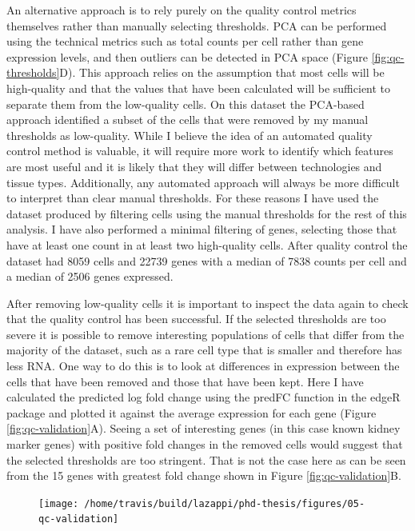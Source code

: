 \documentclass[11pt,a4paper,titlepage,twoside,openright]{style/unimelbthesis}
\theoremstyle{definition}
\theoremstyle{definition}
\theoremstyle{definition}
\theoremstyle{remark}
\begin{document}
\begin{mainmatter}
An alternative approach is to rely purely on the quality control metrics themselves rather than manually selecting thresholds. PCA can be performed using the technical metrics such as total counts per cell rather than gene expression levels, and then outliers can be detected in PCA space (Figure \ref{fig:qc-thresholds}D). This approach relies on the assumption that most cells will be high-quality and that the values that have been calculated will be sufficient to separate them from the low-quality cells. On this dataset the PCA-based approach identified a subset of the cells that were removed by my manual thresholds as low-quality. While I believe the idea of an automated quality control method is valuable, it will require more work to identify which features are most useful and it is likely that they will differ between technologies and tissue types. Additionally, any automated approach will always be more difficult to interpret than clear manual thresholds. For these reasons I have used the dataset produced by filtering cells using the manual thresholds for the rest of this analysis. I have also performed a minimal filtering of genes, selecting those that have at least one count in at least two high-quality cells. After quality control the dataset had 8059 cells and 22739 genes with a median of 7838 counts per cell and a median of 2506 genes expressed.

After removing low-quality cells it is important to inspect the data again to check that the quality control has been successful. If the selected thresholds are too severe it is possible to remove interesting populations of cells that differ from the majority of the dataset, such as a rare cell type that is smaller and therefore has less RNA. One way to do this is to look at differences in expression between the cells that have been removed and those that have been kept. Here I have calculated the predicted log fold change using the predFC function in the edgeR package and plotted it against the average expression for each gene (Figure \ref{fig:qc-validation}A). Seeing a set of interesting genes (in this case known kidney marker genes) with positive fold changes in the removed cells would suggest that the selected thresholds are too stringent. That is not the case here as can be seen from the 15 genes with greatest fold change shown in Figure \ref{fig:qc-validation}B.

\begin{figure}

{\centering \texttt{[image: /home/travis/build/lazappi/phd-thesis/figures/05-qc-validation]} 

}
\end{figure}
\end{mainmatter}
\end{document}
